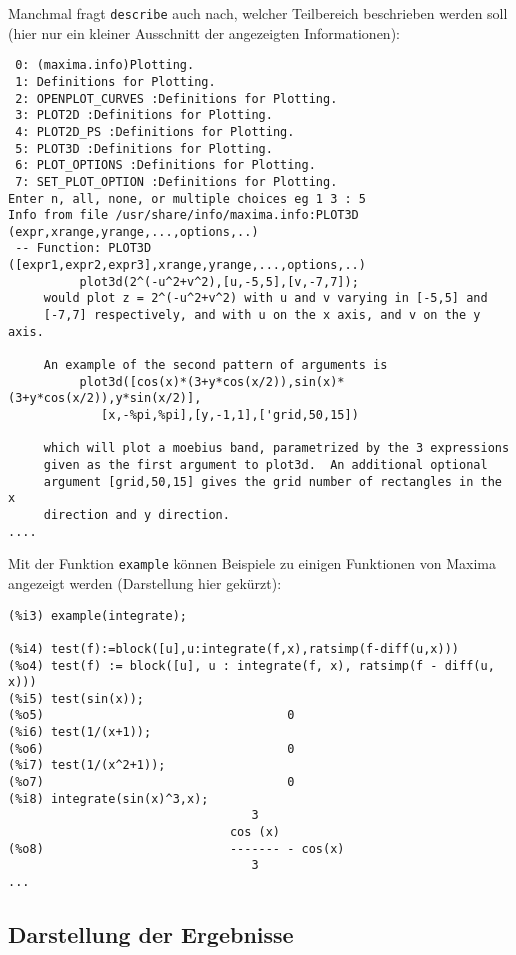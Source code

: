 \documentclass[12pt]{scrartcl}
\begin{document}
Manchmal fragt \texttt{describe} auch nach, welcher Teilbereich
beschrieben werden soll (hier nur ein kleiner Ausschnitt der
angezeigten Informationen):

\begin{verbatim}
 0: (maxima.info)Plotting.
 1: Definitions for Plotting.
 2: OPENPLOT_CURVES :Definitions for Plotting.
 3: PLOT2D :Definitions for Plotting.
 4: PLOT2D_PS :Definitions for Plotting.
 5: PLOT3D :Definitions for Plotting.
 6: PLOT_OPTIONS :Definitions for Plotting.
 7: SET_PLOT_OPTION :Definitions for Plotting.
Enter n, all, none, or multiple choices eg 1 3 : 5
Info from file /usr/share/info/maxima.info:PLOT3D (expr,xrange,yrange,...,options,..)
 -- Function: PLOT3D ([expr1,expr2,expr3],xrange,yrange,...,options,..)
          plot3d(2^(-u^2+v^2),[u,-5,5],[v,-7,7]);
     would plot z = 2^(-u^2+v^2) with u and v varying in [-5,5] and
     [-7,7] respectively, and with u on the x axis, and v on the y axis.

     An example of the second pattern of arguments is
          plot3d([cos(x)*(3+y*cos(x/2)),sin(x)*(3+y*cos(x/2)),y*sin(x/2)],
             [x,-%pi,%pi],[y,-1,1],['grid,50,15])

     which will plot a moebius band, parametrized by the 3 expressions
     given as the first argument to plot3d.  An additional optional
     argument [grid,50,15] gives the grid number of rectangles in the x
     direction and y direction.
....
\end{verbatim}

Mit der Funktion \texttt{example} können Beispiele zu einigen
Funktionen von Maxima angezeigt werden (Darstellung hier gekürzt):

\begin{verbatim}
(%i3) example(integrate);

(%i4) test(f):=block([u],u:integrate(f,x),ratsimp(f-diff(u,x)))
(%o4) test(f) := block([u], u : integrate(f, x), ratsimp(f - diff(u, x)))
(%i5) test(sin(x));
(%o5)                                  0
(%i6) test(1/(x+1));
(%o6)                                  0
(%i7) test(1/(x^2+1));
(%o7)                                  0
(%i8) integrate(sin(x)^3,x);
                                  3
                               cos (x)
(%o8)                          ------- - cos(x)
                                  3
...
\end{verbatim}

\subsection{Darstellung der Ergebnisse}
\end{document}
